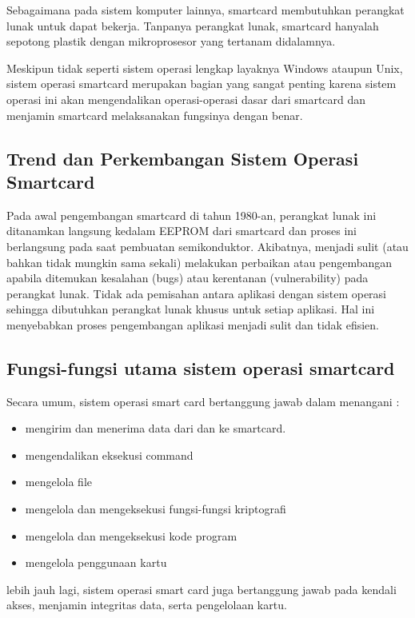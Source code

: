 \documentclass[a4paper, 12pt]{report}
\begin{document}
Sebagaimana pada sistem komputer lainnya, smartcard membutuhkan perangkat lunak untuk dapat bekerja. Tanpanya perangkat lunak, smartcard hanyalah sepotong plastik dengan mikroprosesor yang tertanam didalamnya. 

Meskipun tidak seperti sistem operasi lengkap layaknya Windows ataupun Unix, sistem operasi smartcard merupakan bagian yang sangat penting karena sistem operasi ini akan mengendalikan operasi-operasi dasar dari smartcard dan menjamin smartcard melaksanakan fungsinya dengan benar.


\subsection{Trend dan Perkembangan Sistem Operasi Smartcard}

Pada awal pengembangan smartcard di tahun 1980-an, perangkat lunak ini ditanamkan langsung kedalam EEPROM dari smartcard dan proses ini berlangsung pada saat pembuatan semikonduktor. Akibatnya, menjadi sulit (atau bahkan tidak mungkin sama sekali) melakukan perbaikan atau pengembangan apabila ditemukan kesalahan (bugs) atau kerentanan (vulnerability) pada perangkat lunak. Tidak ada pemisahan antara aplikasi dengan sistem operasi sehingga dibutuhkan perangkat lunak khusus untuk setiap aplikasi. Hal ini menyebabkan proses pengembangan aplikasi menjadi sulit dan tidak efisien.

\subsection{Fungsi-fungsi utama sistem operasi smartcard}
\label{fungsi-utama-cos}

Secara umum, sistem operasi smart card bertanggung jawab dalam menangani \cite{SCHandbook}:

\begin{itemize}
\item mengirim dan menerima data dari dan ke smartcard.
\item mengendalikan eksekusi command
\item mengelola file
\item mengelola dan mengeksekusi fungsi-fungsi kriptografi
\item mengelola dan mengeksekusi kode program  
\item mengelola penggunaan kartu
\end{itemize}

lebih jauh lagi, sistem operasi smart card juga bertanggung jawab pada kendali akses, menjamin integritas data, serta pengelolaan kartu.
\end{document}
